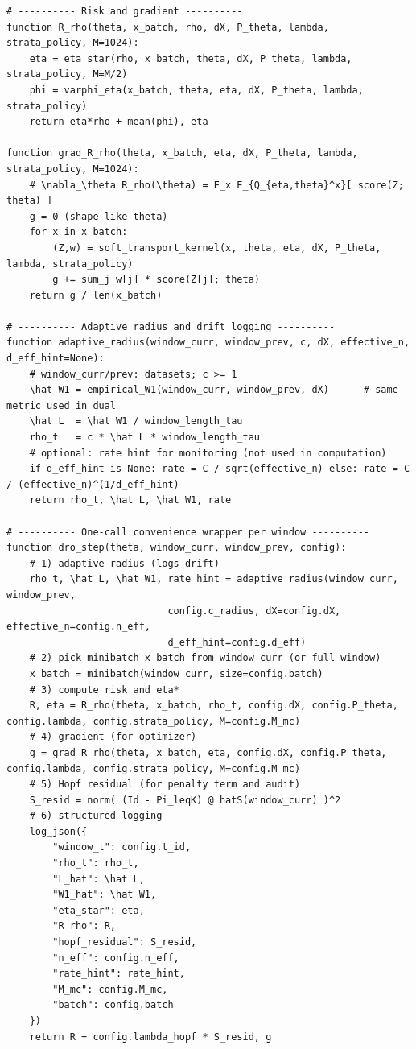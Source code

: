 \begin{lstlisting}
# ---------- Risk and gradient ----------
function R_rho(theta, x_batch, rho, dX, P_theta, lambda, strata_policy, M=1024):
    eta = eta_star(rho, x_batch, theta, dX, P_theta, lambda, strata_policy, M=M/2)
    phi = varphi_eta(x_batch, theta, eta, dX, P_theta, lambda, strata_policy)
    return eta*rho + mean(phi), eta

function grad_R_rho(theta, x_batch, eta, dX, P_theta, lambda, strata_policy, M=1024):
    # \nabla_\theta R_rho(\theta) = E_x E_{Q_{eta,theta}^x}[ score(Z; theta) ]
    g = 0 (shape like theta)
    for x in x_batch:
        (Z,w) = soft_transport_kernel(x, theta, eta, dX, P_theta, lambda, strata_policy)
        g += sum_j w[j] * score(Z[j]; theta)
    return g / len(x_batch)

# ---------- Adaptive radius and drift logging ----------
function adaptive_radius(window_curr, window_prev, c, dX, effective_n, d_eff_hint=None):
    # window_curr/prev: datasets; c >= 1
    \hat W1 = empirical_W1(window_curr, window_prev, dX)      # same metric used in dual
    \hat L  = \hat W1 / window_length_tau
    rho_t   = c * \hat L * window_length_tau
    # optional: rate hint for monitoring (not used in computation)
    if d_eff_hint is None: rate = C / sqrt(effective_n) else: rate = C / (effective_n)^(1/d_eff_hint)
    return rho_t, \hat L, \hat W1, rate

# ---------- One-call convenience wrapper per window ----------
function dro_step(theta, window_curr, window_prev, config):
    # 1) adaptive radius (logs drift)
    rho_t, \hat L, \hat W1, rate_hint = adaptive_radius(window_curr, window_prev,
                            config.c_radius, dX=config.dX, effective_n=config.n_eff,
                            d_eff_hint=config.d_eff)
    # 2) pick minibatch x_batch from window_curr (or full window)
    x_batch = minibatch(window_curr, size=config.batch)
    # 3) compute risk and eta*
    R, eta = R_rho(theta, x_batch, rho_t, config.dX, config.P_theta, config.lambda, config.strata_policy, M=config.M_mc)
    # 4) gradient (for optimizer)
    g = grad_R_rho(theta, x_batch, eta, config.dX, config.P_theta, config.lambda, config.strata_policy, M=config.M_mc)
    # 5) Hopf residual (for penalty term and audit)
    S_resid = norm( (Id - Pi_leqK) @ hatS(window_curr) )^2
    # 6) structured logging
    log_json({
        "window_t": config.t_id,
        "rho_t": rho_t,
        "L_hat": \hat L,
        "W1_hat": \hat W1,
        "eta_star": eta,
        "R_rho": R,
        "hopf_residual": S_resid,
        "n_eff": config.n_eff,
        "rate_hint": rate_hint,
        "M_mc": config.M_mc,
        "batch": config.batch
    })
    return R + config.lambda_hopf * S_resid, g
\end{lstlisting}


